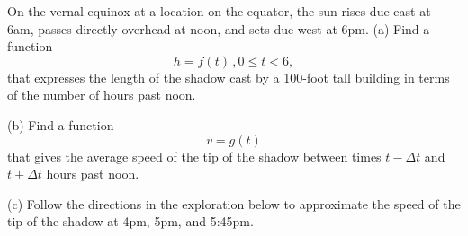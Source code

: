 \documentclass{ximera}
\begin{document}
\begin{question} \label{Q5:RightTriangle}
On the vernal equinox at a location on the equator, the sun rises due east at 6am, passes directly overhead at noon, and sets due west at 6pm. 
(a) Find a function 
\[
    h = f(t) \, , 0\leq t <6 ,
\]
that expresses the length of the shadow cast by a 100-foot tall building in terms of the number of hours past noon.

(b) Find a function 
\[
     v = g(t) 
\]
that gives the average speed of the tip of the shadow between times $t - \Delta t$ and $t+\Delta t$ hours past noon. 

(c) Follow the directions in the exploration below to approximate the speed of the tip of the shadow at 4pm, 5pm, and 5:45pm.

\begin{exploration}

 
\begin{onlineOnly}
    \begin{center}
\end{center}
\end{onlineOnly}
\end{exploration} 

\end{question}
\end{document}
